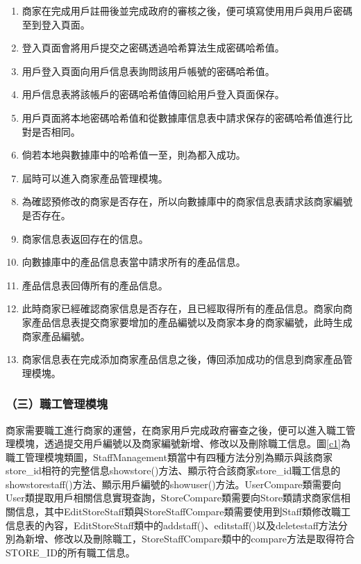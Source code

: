 	\begin{enumerate}
	\item 商家在完成用戶註冊後並完成政府的審核之後，便可填寫使用用戶與用戶密碼至到登入頁面。
	\item 登入頁面會將用戶提交之密碼透過哈希算法生成密碼哈希值。
	\item 用戶登入頁面向用戶信息表詢問該用戶帳號的密碼哈希值。
	\item 用戶信息表將該帳戶的密碼哈希值傳回給用戶登入頁面保存。
	\item 用戶頁面將本地密碼哈希值和從數據庫信息表中請求保存的密碼哈希值進行比對是否相同。
	\item 倘若本地與數據庫中的哈希值一至，則為都入成功。
	\item 屆時可以進入商家產品管理模塊。
	\item 為確認預修改的商家是否存在，所以向數據庫中的商家信息表請求該商家編號是否存在。
	\item 商家信息表返回存在的信息。
	\item 向數據庫中的產品信息表當中請求所有的產品信息。
	\item 產品信息表回傳所有的產品信息。
	\item 此時商家已經確認商家信息是否存在，且已經取得所有的產品信息。商家向商家產品信息表提交商家要增加的產品編號以及商家本身的商家編號，此時生成商家產品編號。
	\item 商家信息表在完成添加商家產品信息之後，傳回添加成功的信息到商家產品管理模塊。
	\end{enumerate}


\subsubsection{（三）職工管理模塊}
商家需要職工進行商家的運營，在商家用戶完成政府審查之後，便可以進入職工管理模塊，透過提交用戶編號以及商家編號新增、修改以及刪除職工信息。圖\ref{c1}為職工管理模塊類圖，StaffManagement類當中有四種方法分別為顯示與該商家store\_id相符的完整信息showstore()方法、顯示符合該商家store\_id職工信息的showstorestaff()方法、顯示用戶編號的showuser()方法。UserCompare類需要向User類提取用戶相關信息實現查詢，StoreCompare類需要向Store類請求商家信相關信息，其中EditStoreStaff類與StoreStaffCompare類需要使用到Staff類修改職工信息表的內容，EditStoreStaff類中的addstaff()、editstaff()以及deletestaff方法分別為新增、修改以及刪除職工，StoreStaffCompare類中的compare方法是取得符合STORE\_ID的所有職工信息。


